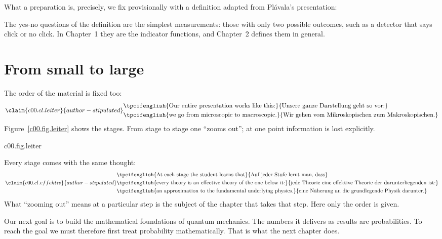 What a preparation is, precisely, we fix provisionally with a definition adapted from
Plávala's presentation:


The yes-no questions of the definition are the simplest measurements: those with only two
possible outcomes, such as a detector that says click or no click. In Chapter~1 they are the
indicator functions, and Chapter~2 defines them in general.

\section{From small to large}\label{c00.s3}

The order of the material is fixed too:
\begin{equation}\label{c00.eq.leiter}\claim{c00.cl.leiter}{author-stipulated}
  \begin{aligned}
    &\text{\tpcifenglish{Our entire presentation works like this:}{Unsere ganze Darstellung geht so vor:}} \\
    &\text{\tpcifenglish{we go from microscopic to macroscopic.}{Wir gehen vom Mikroskopischen zum Makroskopischen.}}
  \end{aligned}
\end{equation}
Figure~\ref{c00.fig.leiter} shows the stages. From stage to stage one “zooms out”; at one
point information is lost explicitly.

\begin{tpcfigure}{c00.fig.leiter}
  \caption{The ladder of theories of this course, from the bottom (microscopic) to the top
    (macroscopic). The labels of the six stages and the five arrows are selected excerpts
    from the stipulation to which sentence~\eqref{c00.eq.leiter} refers. There the last stage
    reads in full “thermodynamics as the ultimate effective theory of all physics at the
    macroscale”. GPT stands for “general probabilistic theory”, QM for quantum mechanics.
    The course begins at the bottom: Chapters~1 and~2 treat stage~1.}
\end{tpcfigure}

Every stage comes with the same thought:
\begin{equation}\label{c00.eq.effektiv}\claim{c00.cl.effektiv}{author-stipulated}
  \begin{aligned}
    &\text{\tpcifenglish{At each stage the student learns that}{Auf jeder Stufe lernt man, dass}} \\
    &\text{\tpcifenglish{every theory is an effective theory of the one below it:}{jede Theorie eine effektive Theorie der darunterliegenden ist:}} \\
    &\text{\tpcifenglish{an approximation to the fundamental underlying physics.}{eine Näherung an die grundlegende Physik darunter.}}
  \end{aligned}
\end{equation}
What “zooming out” means at a particular step is the subject of the chapter that takes that
step. Here only the order is given.

Our next goal is to build the mathematical foundations of quantum mechanics. The numbers it
delivers as results are probabilities. To reach the goal we must therefore first treat
probability mathematically. That is what the next chapter does.
